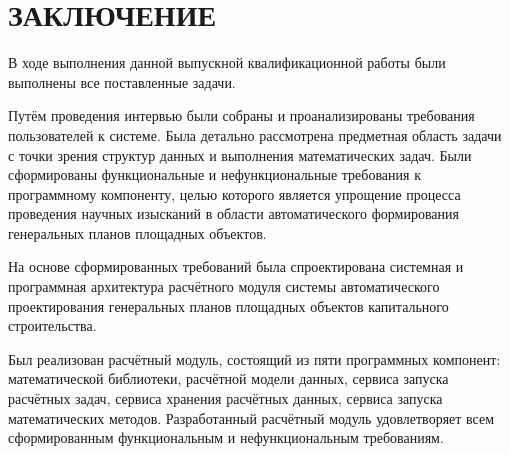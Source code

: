 \section*{\Large{ЗАКЛЮЧЕНИЕ}}

В ходе выполнения данной выпускной квалификационной работы были выполнены все поставленные задачи.

Путём проведения интервью были собраны и проанализированы требования пользователей к системе.
Была детально рассмотрена предметная область задачи с точки зрения структур данных
и выполнения математических задач.
Были сформированы функциональные и нефункциональные требования к программному компоненту, целью
которого является упрощение процесса проведения научных изысканий
в области автоматического формирования генеральных планов площадных объектов.

На основе сформированных требований была спроектирована системная и программная архитектура
расчётного модуля системы автоматического проектирования генеральных
планов площадных объектов капитального строительства.

Был реализован расчётный модуль, состоящий из пяти программных компонент: математической библиотеки,
расчётной модели данных, сервиса запуска расчётных задач, сервиса хранения расчётных данных,
сервиса запуска математических методов.
Разработанный расчётный модуль удовлетворяет всем сформированным функциональным и нефункциональным требованиям.
